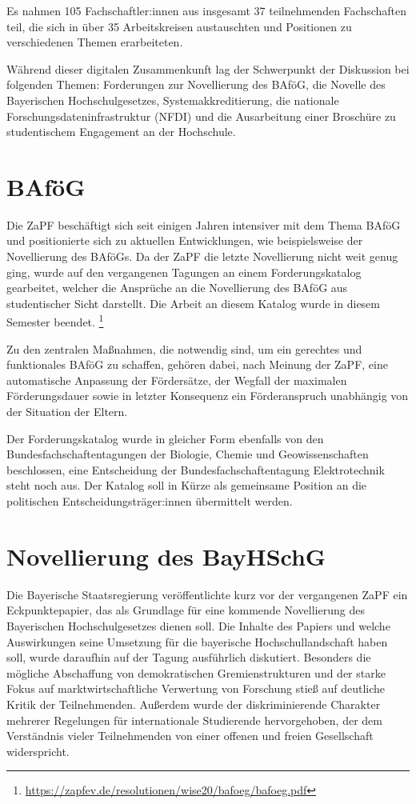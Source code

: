 \documentclass{scrartcl}
\begin{document}
Es nahmen 105 Fachschaftler:innen aus insgesamt 37 teilnehmenden Fachschaften teil, die sich in über 35 Arbeitskreisen austauschten und Positionen zu verschiedenen Themen erarbeiteten.

Während dieser digitalen Zusammenkunft lag der Schwerpunkt der Diskussion bei folgenden Themen: Forderungen zur Novellierung des BAföG, die Novelle des Bayerischen Hochschulgesetzes, Systemakkreditierung, die nationale Forschungsdateninfrastruktur (NFDI) und die Ausarbeitung einer Broschüre zu studentischem Engagement an der Hochschule.

\section*{BAföG}

Die ZaPF beschäftigt sich seit einigen Jahren intensiver mit dem Thema BAföG und positionierte sich zu aktuellen Entwicklungen, wie beispielsweise der Novellierung des BAföGs. Da der ZaPF die letzte Novellierung nicht weit genug ging, wurde auf den vergangenen Tagungen an einem Forderungskatalog gearbeitet, welcher die Ansprüche an die Novellierung des BAföG aus studentischer Sicht darstellt. Die Arbeit an diesem Katalog wurde in diesem Semester beendet. \footnote{\url{https://zapfev.de/resolutionen/wise20/bafoeg/bafoeg.pdf}}

Zu den zentralen Maßnahmen, die notwendig sind, um ein gerechtes und funktionales BAföG zu schaffen, gehören dabei, nach Meinung der ZaPF, eine automatische Anpassung der Fördersätze, der Wegfall der maximalen Förderungsdauer sowie in letzter Konsequenz ein Förderanspruch unabhängig von der Situation der Eltern.

Der Forderungskatalog wurde in gleicher Form ebenfalls von den Bundesfachschaftentagungen der Biologie, Chemie und Geowissenschaften beschlossen, eine Entscheidung der Bundesfachschaftentagung Elektrotechnik steht noch aus. Der Katalog soll in Kürze als gemeinsame Position an die politischen Entscheidungsträger:innen übermittelt werden.

\section*{Novellierung des BayHSchG}

Die Bayerische Staatsregierung veröffentlichte kurz vor der vergangenen ZaPF ein Eckpunktepapier, das als Grundlage für eine kommende Novellierung des Bayerischen Hochschulgesetzes dienen soll. Die Inhalte des Papiers und welche Auswirkungen seine Umsetzung für die bayerische Hochschullandschaft haben soll, wurde daraufhin auf der Tagung ausführlich diskutiert. Besonders die mögliche Abschaffung von demokratischen Gremienstrukturen und der starke Fokus auf marktwirtschaftliche Verwertung von Forschung stieß auf deutliche Kritik der Teilnehmenden. Außerdem wurde der diskriminierende Charakter mehrerer Regelungen für internationale Studierende hervorgehoben, der dem Verständnis vieler Teilnehmenden von einer offenen und freien Gesellschaft widerspricht.
\end{document}
